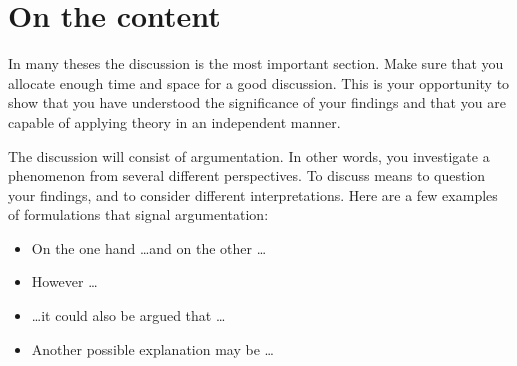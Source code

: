\documentclass[a4paper,twoside]{bth}
\begin{document}
\section{On the content}
In many theses the discussion is the most important section. Make sure that you allocate enough time and space for a good discussion. This is your opportunity to show that you have understood the significance of your findings and that you are capable of applying theory in an independent manner.

The discussion will consist of argumentation. In other words, you investigate a phenomenon from several different perspectives. To discuss means to question your findings, and to consider different interpretations. Here are a few examples of formulations that signal argumentation:

\begin{itemize}
    \item On the one hand \dots and on the other \dots
    \item However \dots
    \item \dots it could also be argued that \dots
    \item Another possible explanation may be \dots
\end{itemize}
\end{document}
